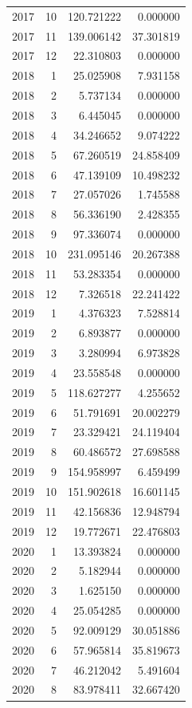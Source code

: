 \begin{tabular}{rrrr}
2017 & 10 & 120.721222 & 0.000000 \\
2017 & 11 & 139.006142 & 37.301819 \\
2017 & 12 & 22.310803 & 0.000000 \\
2018 & 1 & 25.025908 & 7.931158 \\
2018 & 2 & 5.737134 & 0.000000 \\
2018 & 3 & 6.445045 & 0.000000 \\
2018 & 4 & 34.246652 & 9.074222 \\
2018 & 5 & 67.260519 & 24.858409 \\
2018 & 6 & 47.139109 & 10.498232 \\
2018 & 7 & 27.057026 & 1.745588 \\
2018 & 8 & 56.336190 & 2.428355 \\
2018 & 9 & 97.336074 & 0.000000 \\
2018 & 10 & 231.095146 & 20.267388 \\
2018 & 11 & 53.283354 & 0.000000 \\
2018 & 12 & 7.326518 & 22.241422 \\
2019 & 1 & 4.376323 & 7.528814 \\
2019 & 2 & 6.893877 & 0.000000 \\
2019 & 3 & 3.280994 & 6.973828 \\
2019 & 4 & 23.558548 & 0.000000 \\
2019 & 5 & 118.627277 & 4.255652 \\
2019 & 6 & 51.791691 & 20.002279 \\
2019 & 7 & 23.329421 & 24.119404 \\
2019 & 8 & 60.486572 & 27.698588 \\
2019 & 9 & 154.958997 & 6.459499 \\
2019 & 10 & 151.902618 & 16.601145 \\
2019 & 11 & 42.156836 & 12.948794 \\
2019 & 12 & 19.772671 & 22.476803 \\
2020 & 1 & 13.393824 & 0.000000 \\
2020 & 2 & 5.182944 & 0.000000 \\
2020 & 3 & 1.625150 & 0.000000 \\
2020 & 4 & 25.054285 & 0.000000 \\
2020 & 5 & 92.009129 & 30.051886 \\
2020 & 6 & 57.965814 & 35.819673 \\
2020 & 7 & 46.212042 & 5.491604 \\
2020 & 8 & 83.978411 & 32.667420 \\

\end{tabular}
